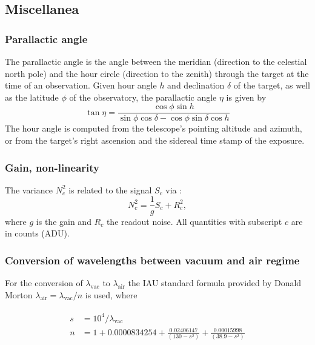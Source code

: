 \subsection{Miscellanea}
\label{ssec:miscellanea}

\subsubsection{Parallactic angle}
\label{sssec:parallactic_angle}

The parallactic angle is the angle between the meridian (direction to the celestial north pole) and the hour circle (direction to the zenith) through the target at the time of an observation. Given hour angle $h$ and declination $\delta$ of the target, as well as the latitude $\phi$ of the observatory, the parallactic angle $\eta$ is given by
\begin{equation}
  \label{eq:parallactic_angle}
  \tan\eta = \frac{\cos\phi\sin h}{\sin\phi \cos\delta - \cos\phi \sin\delta \cos h}
\end{equation}
The hour angle is computed from the telescope's pointing altitude and azimuth, or from the target's right ascension and the sidereal time stamp of the exposure.

\subsubsection{Gain, non-linearity}
\label{sssec:gain}

The variance $N_{c}^{2}$ is related to the signal $S_{c}$ via \cite[Section 9.1]{McLean2008}:
\begin{equation}
  \label{eq:signal-variance}
  N_{c}^{2} = \frac{1}{g} S_{c} + R_{c}^{2},
\end{equation}
where $g$ is the gain and $R_{c}$ the readout noise. All quantities with subscript $c$ are in counts (ADU).

\subsubsection{Conversion of wavelengths between vacuum and air regime}\label{ssec:vacair}
For the conversion of $\lambda_\textrm{vac}$ to $\lambda_\textrm{air}$ the \ac{IAU} standard formula provided by Donald Morton \cite{mor00} $\lambda_\textrm{air}=\lambda_\textrm{vac}/n$ is used, where

\begin{eqnarray}\label{eq:air2vac}
\left.\begin{aligned}
    s &=10^4 / \lambda_{\textrm{vac}}\\
    n &= 1+0.0000834254 + \frac{0.02406147}{(130 - s^2)} + \frac{0.00015998}{(38.9 - s^2)}
\end{aligned}\right.
\end{eqnarray}

